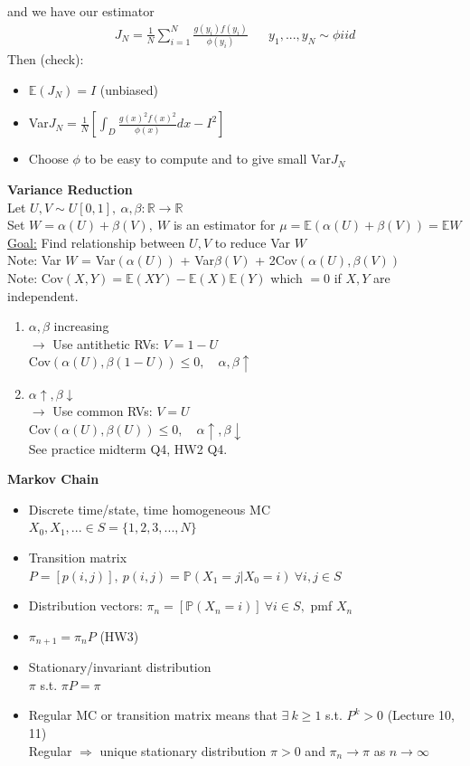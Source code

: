 \documentclass[12pt, letterpaper]{article}
\begin{document}
and we have our estimator 
\begin{align*}
    J_N = \frac 1N \sum_{i=1}^{N} \frac{g(y_i)f(y_i)}{\phi(y_i)} && y_1, ..., y_N \sim \phi iid
\end{align*}
Then (check):
\begin{itemize}
    \item $\mathbb{E}(J_N) = I$ (unbiased)
    \item Var$J_N = \frac 1N \left[\int_D \frac{g(x)^2f(x)^2}{\phi(x)}dx - I^2\right]$
    \item Choose $\phi$ to be easy to compute and to give small Var$J_N$
\end{itemize}
\textbf{Variance Reduction} \\
Let $U, V \sim U[0,1],\ \alpha, \beta: \mathbb{R} \rightarrow \mathbb{R}$ \\
Set $W = \alpha(U) + \beta(V),\ W$ is an estimator for $\mu = \mathbb{E}(\alpha(U)+\beta(V)) = \mathbb{E} W$\\
\underline{Goal:} Find relationship between $U,V$ to reduce Var $W$  \\
Note: Var $W$ = Var$(\alpha(U))$ + Var$\beta(V)$ + 2Cov$(\alpha(U),\beta(V))$ \\
Note: Cov$(X,Y) = \mathbb{E}(XY) - \mathbb{E}(X)\mathbb{E}(Y)$ which $= 0 $ if $X,Y$ are independent.
\begin{enumerate}
    \item $\alpha, \beta$ increasing \\
    $\rightarrow$ Use antithetic RVs: $V = 1-U$ \\
    Cov$(\alpha(U),\beta(1-U)) \le 0, \quad \alpha, \beta \uparrow$
    \item $\alpha \uparrow, \beta \downarrow$ \\
    $\rightarrow$ Use common RVs: $V = U$ \\
    Cov$(\alpha(U), \beta(U)) \le 0, \quad \alpha \uparrow, \beta \downarrow$ \\
    See practice midterm Q4, HW2 Q4.
\end{enumerate}
\textbf{Markov Chain}
\begin{itemize}
    \item Discrete time/state, time homogeneous MC \\
    $X_0, X_1, ... \in S = \{1,2,3,...,N\}$
    \item Transition matrix \\
    $P = [p(i,j)],\ p(i,j) = \mathbb{P}(X_1 = j | X_0 = i)\ \forall i,j \in S$
    \item Distribution vectors:
    $\pi_n = [\mathbb{P}(X_n = i)]\ \forall i \in S, $ pmf $X_n$
    \item $\pi_{n+1} = \pi_n P$ (HW3)
    \item Stationary/invariant distribution \\
    $\pi $ s.t. $\pi P = \pi$
    \item Regular MC or transition matrix means that $\exists\ k \ge 1$ s.t. $P^k > 0$ (Lecture 10, 11) \\
    Regular $\Rightarrow$ unique stationary distribution $\pi > 0$ and $\pi_n \rightarrow \pi$ as $n \rightarrow\infty$
\end{itemize}
\end{document}

